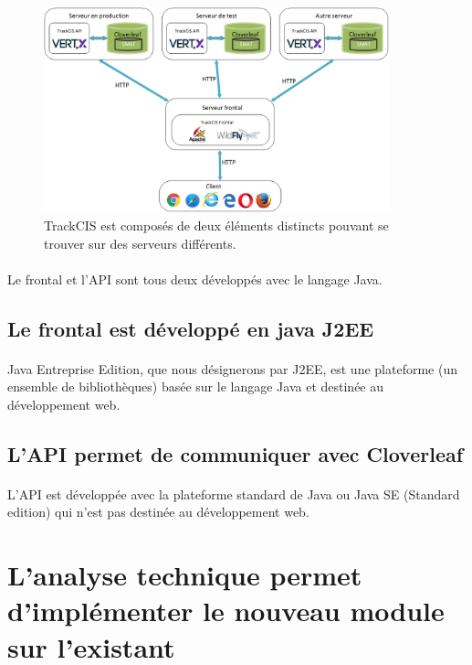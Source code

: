 			\begin{figure}[H]%
				\centering
				\includegraphics[width=10cm]{../img/part3/archi_trackcis.png}
				\caption{\label{archi_trackcis} TrackCIS est composés de deux éléments
				distincts pouvant se trouver sur des serveurs différents.}
			\end{figure}
			
			\paragraph{}%
			Le frontal et l'API sont tous deux développés avec le langage Java.
			
		\subsection{Le frontal est développé en java J2EE}
			\paragraph{}%
			Java Entreprise Edition, que nous désignerons par J2EE, est une
			plateforme (un ensemble de bibliothèques) basée sur le langage Java et
			destinée au développement web.
			
		\subsection{L'API permet de communiquer avec Cloverleaf}
			\paragraph{}%
			L'API est développée avec la plateforme standard de Java ou Java SE (Standard
			edition) qui n'est pas destinée au développement web.
	
	\section{L'analyse technique permet d'implémenter le nouveau module sur
	l'existant}
